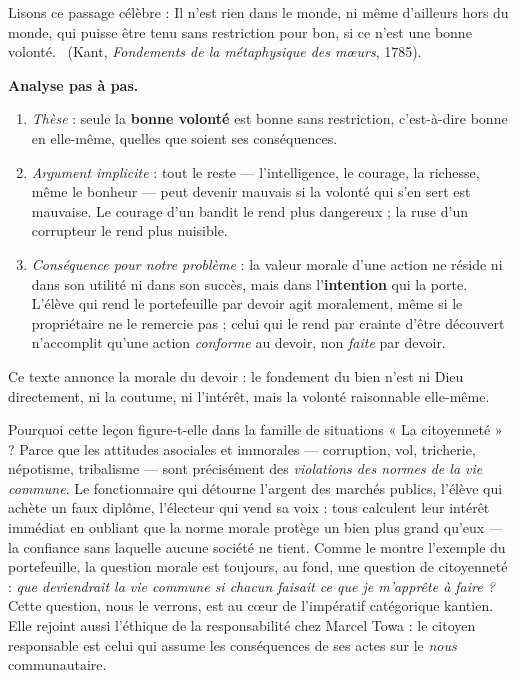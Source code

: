 \documentclass[11pt]{article}
\newcounter{popsec}
\newcounter{popsub}
\newcommand{\courssub}[1]{%
  \stepcounter{popsub}%
  \par\vspace{9pt}\noindent{\popxbold\fontsize{11.5}{13}\selectfont\color{popink}{\color{poporange}\thepopsec.\thepopsub}\hspace{6pt}#1}\par\nopagebreak\vspace{4pt}
}
\begin{document}
\begin{experience}
Lisons ce passage célèbre : \guillemotleft Il n'est rien dans le monde, ni même d'ailleurs hors du monde, qui puisse être tenu sans restriction pour bon, si ce n'est une bonne volonté. \guillemotright\ (Kant, \emph{Fondements de la métaphysique des mœurs}, 1785).

\textbf{Analyse pas à pas.}
\begin{enumerate}
  \item \emph{Thèse} : seule la \textbf{bonne volonté} est bonne sans restriction, c'est-à-dire bonne en elle-même, quelles que soient ses conséquences.
  \item \emph{Argument implicite} : tout le reste — l'intelligence, le courage, la richesse, même le bonheur — peut devenir mauvais si la volonté qui s'en sert est mauvaise. Le courage d'un bandit le rend plus dangereux ; la ruse d'un corrupteur le rend plus nuisible.
  \item \emph{Conséquence pour notre problème} : la valeur morale d'une action ne réside ni dans son utilité ni dans son succès, mais dans l'\textbf{intention} qui la porte. L'élève qui rend le portefeuille par devoir agit moralement, même si le propriétaire ne le remercie pas ; celui qui le rend par crainte d'être découvert n'accomplit qu'une action \emph{conforme} au devoir, non \emph{faite} par devoir.
\end{enumerate}
Ce texte annonce la morale du devoir : le fondement du bien n'est ni Dieu directement, ni la coutume, ni l'intérêt, mais la volonté raisonnable elle-même.
\end{experience}

\courssub{Enjeu citoyen : la morale et la vie en société}

Pourquoi cette leçon figure-t-elle dans la famille de situations « La citoyenneté » ? Parce que les attitudes asociales et immorales — corruption, vol, tricherie, népotisme, tribalisme — sont précisément des \emph{violations des normes de la vie commune}. Le fonctionnaire qui détourne l'argent des marchés publics, l'élève qui achète un faux diplôme, l'électeur qui vend sa voix : tous calculent leur intérêt immédiat en oubliant que la norme morale protège un bien plus grand qu'eux — la confiance sans laquelle aucune société ne tient. Comme le montre l'exemple du portefeuille, la question morale est toujours, au fond, une question de citoyenneté : \emph{que deviendrait la vie commune si chacun faisait ce que je m'apprête à faire ?} Cette question, nous le verrons, est au cœur de l'impératif catégorique kantien. Elle rejoint aussi l'éthique de la responsabilité chez Marcel Towa : le citoyen responsable est celui qui assume les conséquences de ses actes sur le \emph{nous} communautaire.
\end{document}
